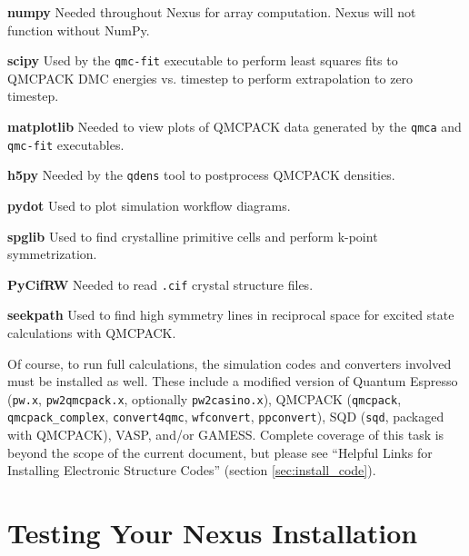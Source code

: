 \documentclass[oneside,11pt]{memoir}
\numberwithin{equation}{section}
\begin{document}
\begin{description}
  \item{\textbf{numpy}} \newline Needed throughout Nexus for array computation.  Nexus will not function without NumPy.
  \item{\textbf{scipy}} \newline Used by the \texttt{qmc-fit} executable to perform least squares fits to QMCPACK DMC energies vs. timestep to perform extrapolation to zero timestep.
  \item{\textbf{matplotlib}} \newline Needed to view plots of QMCPACK data generated by the \texttt{qmca} and \texttt{qmc-fit} executables.
  \item{\textbf{h5py}} \newline Needed by the \texttt{qdens} tool to postprocess QMCPACK densities.
  \item{\textbf{pydot}} \newline Used to plot simulation workflow diagrams.
  \item{\textbf{spglib}} \newline Used to find crystalline primitive cells and perform k-point symmetrization.
  \item{\textbf{PyCifRW}} \newline Needed to read \texttt{.cif} crystal structure files.
  \item{\textbf{seekpath}} \newline Used to find high symmetry lines in reciprocal space for excited state calculations with QMCPACK.  
\end{description}

Of course, to run full calculations, the simulation codes and converters 
involved must be installed as well.  These include a modified version of 
Quantum Espresso (\texttt{pw.x}, \texttt{pw2qmcpack.x}, optionally 
\texttt{pw2casino.x}), QMCPACK (\texttt{qmcpack}, \texttt{qmcpack\_complex}, \texttt{convert4qmc}, \texttt{wfconvert}, \texttt{ppconvert}), 
SQD (\texttt{sqd}, packaged with QMCPACK), VASP, and/or GAMESS.  
Complete coverage of this task is beyond the scope of the current document, but 
please see ``Helpful Links for Installing Electronic Structure Codes'' 
(section \ref{sec:install_code}).


\section{Testing Your Nexus Installation}
\end{document}
